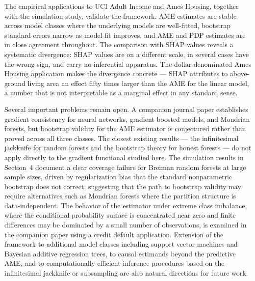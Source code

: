 \documentclass[conference]{IEEEtran}
\begin{document}
	The empirical applications to UCI Adult Income and Ames Housing, together with the simulation study, validate the framework. AME estimates are stable across model classes where the underlying models are well-fitted, bootstrap standard errors narrow as model fit improves, and AME and PDP estimates are in close agreement throughout. The comparison with SHAP values reveals a systematic divergence: SHAP values are on a different scale, in several cases have the wrong sign, and carry no inferential apparatus. The dollar-denominated Ames Housing application makes the divergence concrete --- SHAP attributes to above-ground living area an effect fifty times larger than the AME for the linear model, a number that is not interpretable as a marginal effect in any standard sense.
	
	Several important problems remain open. A companion journal paper establishes gradient consistency for neural networks, gradient boosted models, and Mondrian forests, but bootstrap validity for the AME estimator is conjectured rather than proved across all three classes. The closest existing results --- the infinitesimal jackknife for random forests \cite{wager2014confidence} and the bootstrap theory for honest forests \cite{wager2018forests} --- do not apply directly to the gradient functional studied here. The simulation results in Section~4 document a clear coverage failure for Breiman random forests at large sample sizes, driven by regularization bias that the standard nonparametric bootstrap does not correct, suggesting that the path to bootstrap validity may require alternatives such as Mondrian forests where the partition structure is data-independent. The behavior of the estimator under extreme class imbalance, where the conditional probability surface is concentrated near zero and finite differences may be dominated by a small number of observations, is examined in the companion paper using a credit default application. Extension of the framework to additional model classes including support vector machines and Bayesian additive regression trees, to causal estimands beyond the predictive AME, and to computationally efficient inference procedures based on the infinitesimal jackknife or subsampling are also natural directions for future work.
	
	
	
	
\end{document}
